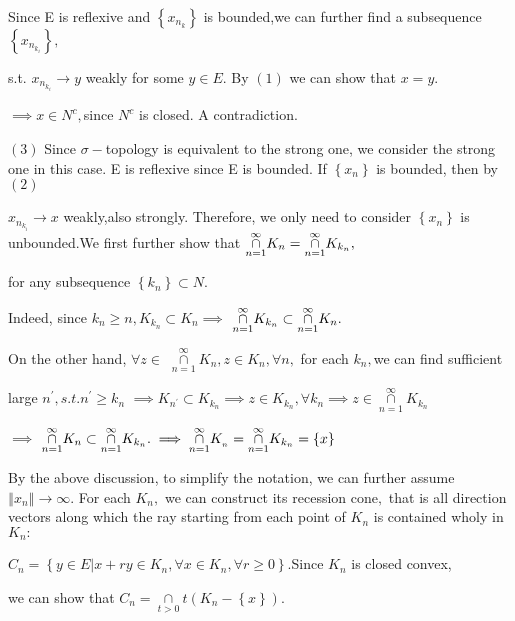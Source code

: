 \documentclass{article}
\begin{document}
Since E is reflexive and $\left\{ x_{n_{k}}\right\} $ is bounded,we can
further find a subsequence $\left\{ x_{n_{k_{i}}}\right\} ,$

s.t. $x_{n_{k_{i}}}\rightarrow y$ weakly for some $y\in E$. By $\left(
1\right) $ we can show that $x=y.$

$\implies x\in N^{c},$since $N^{c}$ is closed. A contradiction.

$\left( 3\right) $ Since $\sigma -$topology is equivalent to the strong one,
we consider the strong one in this case. E is reflexive since E is bounded.
If $\left\{ x_{n}\right\} $ is bounded, then by $\left( 2\right) $

$x_{n_{k_{i}}}\rightarrow x$ weakly,also strongly. Therefore, we only need
to consider $\left\{ x_{n}\right\} $ is unbounded.We first further show that 
$\underset{n=1}{\overset{\infty }{\cap }}K_{n}=\underset{n=1}{\overset{%
\infty }{\cap }}K_{k_{n}},$

for any subsequence $\left\{ k_{n}\right\} \subset N.$

Indeed, since $k_{n}\geq n,K_{k_{n}}\subset K_{n}\implies $ $\underset{n=1}{%
\overset{\infty }{\cap }}K_{k_{n}}\subset \underset{n=1}{\overset{\infty }{%
\cap }}K_{n}.$

On the other hand, $\forall z\in $ $\underset{n=1}{\overset{\infty }{\cap }}%
K_{n},z\in K_{n},\forall n,$ for each $k_{n},$we can find sufficient

large $n^{\prime },s.t.n^{\prime }\geq k_{n}$ $\implies K_{n^{\prime
}}\subset K_{k_{n}}\implies z\in K_{k_{n}},\forall k_{n}\implies z\in 
\underset{n=1}{\overset{\infty }{\cap }}K_{k_{n}}$

$\implies $ $\underset{n=1}{\overset{\infty }{\cap }}K_{n}\subset \underset{%
n=1}{\overset{\infty }{\cap }}K_{k_{n}}.\implies \underset{n=1}{\overset{%
\infty }{\cap }}K_{_{n}}=\underset{n=1}{\overset{\infty }{\cap }}%
K_{k_{n}}=\left\{ x\right\} $

\bigskip By the above discussion, to simplify the notation, we can further
assume $\left\Vert x_{n}\right\Vert \rightarrow \infty .$ For each $K_{n},$
we can construct its recession cone$,$ that is all direction vectors along
which the ray starting from each point of $K_{n}$ is contained wholy in $%
K_{n}:$

$C_{n}=\left\{ y\in E|x+ry\in K_{n},\forall x\in K_{n},\forall r\geq
0\right\} .$Since $K_{n}$ is closed convex, 

we can show that $C_{n}=\underset{t>0}{\cap }t\left( K_{n}-\left\{ x\right\}
\right) .$ 
\end{document}
